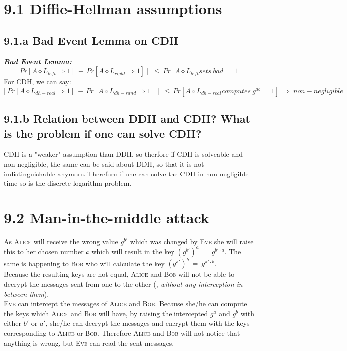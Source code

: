 \documentclass{report}
\begin{document}
	\pagestyle{fancy}
	
	\section*{9.1 Diffie-Hellman assumptions}
		\subsection*{9.1.a Bad Event Lemma on CDH}
			\textit{\textbf{Bad Event Lemma:}}
			\[
				\mid \ Pr[A \diamond L_{left} \Rightarrow 1] \ - \ Pr[A \diamond L_{right} \Rightarrow 1] \mid \ \leq \ Pr [A \diamond L_{left} sets \ bad \ = 1]
			\]
			For CDH, we can say:
			\[
				\mid \ Pr[A \diamond L_{dh-real} \Rightarrow 1] \ - \ Pr[A \diamond L_{dh-rand} \Rightarrow 1] \mid \ \leq \ Pr [A \diamond L_{dh-real} computes \ g^{ab} \ = 1] \ \Rightarrow \ non-negligible
			\]
		\subsection*{9.1.b Relation between DDH and CDH? What is the problem if one can solve CDH?}
			CDH is a "weaker" assumption than DDH, so therfore if CDH is solveable and non-negligible, the same can be said about DDH, so that it is not indistinguishable anymore. Therefore if one can solve the CDH in non-negligible time so is the discrete logarithm problem.
	
	\section*{9.2 Man-in-the-middle attack}
		As \textsc{Alice} will receive the wrong value $g^{b'}$ which was changed by \textsc{Eve} she will raise this to her chosen number $a$ which will result in the key $(g^{b'})^{a} \ = \ g^{b' \cdot a}$. The same is happening to \textsc{Bob} who will calculate the key $(g^{a'})^{b} \ = \ g^{a' \cdot b}$. \\
		Because the resulting keys are not equal, \textsc{Alice} and \textsc{Bob} will not be able to decrypt the messages sent from one to the other (, \textit{without any interception in between them}). \\
		\textsc{Eve} can intercept the messages of \textsc{Alice} and \textsc{Bob}. Because she/he can compute the keys which \textsc{Alice} and \textsc{Bob} will have, by raising the intercepted $g^a$ and $g^b$ with either $b'$ or $a'$, she/he can decrypt the messages and encrypt them with the keys corresponding to \textsc{Alice} or \textsc{Bob}. Therefore \textsc{Alice} and \textsc{Bob} will not notice that anything is wrong, but \textsc{Eve} can read the sent messages.
\end{document}
